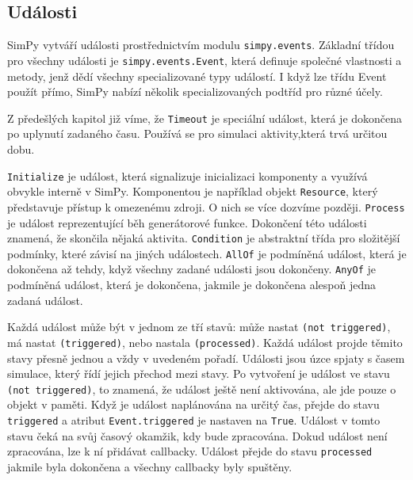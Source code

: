 \documentclass[12pt,a4paper]{article}
\begin{document}
\subsection{Události}
SimPy vytváří události prostřednictvím modulu \texttt{simpy.events}. Základní třídou pro všechny události je \texttt{simpy.events.Event}, která definuje společné vlastnosti a metody, jenž dědí všechny specializované typy událostí. I když lze třídu Event použít přímo, SimPy nabízí několik specializovaných podtříd pro různé účely.

Z předešlých kapitol již víme, že \texttt{Timeout} je speciální událost, která je dokončena po uplynutí zadaného času. Používá se pro simulaci aktivity,která trvá určitou dobu.

 \texttt{Initialize} je událost, která signalizuje inicializaci komponenty a využívá obvykle interně v SimPy. Komponentou je například objekt \texttt{Resource}, který představuje přístup k omezenému zdroji. O nich se více dozvíme později. \texttt{Process} je událost reprezentující běh generátorové funkce. Dokončení této události znamená, že skončila nějaká aktivita. \texttt{Condition} je abstraktní třída pro složitější podmínky, které závisí na jiných událostech. \texttt{AllOf} je podmíněná událost, která je dokončena až tehdy, když všechny zadané události jsou dokončeny. \texttt{AnyOf} je podmíněná událost, která je dokončena, jakmile je dokončena alespoň jedna zadaná událost.

Každá událost může být v jednom ze tří stavů: může nastat \texttt{(not triggered)}, má nastat \texttt{(triggered)}, nebo nastala \texttt{(processed)}. Každá událost projde těmito stavy přesně jednou a vždy v uvedeném pořadí. Události jsou úzce spjaty s časem simulace, který řídí jejich přechod mezi stavy. Po vytvoření je událost ve stavu \texttt{(not triggered)}, to znamená, že událost ještě není aktivována, ale jde pouze o objekt v paměti. Když je událost naplánována na určitý čas, přejde do stavu \texttt{triggered} a atribut \texttt{Event.triggered} je nastaven na \texttt{True}. Událost v tomto stavu čeká na svůj časový okamžik, kdy bude zpracována. Dokud událost není zpracována, lze k ní přidávat callbacky. Událost přejde do stavu  \texttt{processed} jakmile byla dokončena a všechny callbacky byly spuštěny.
\end{document}
